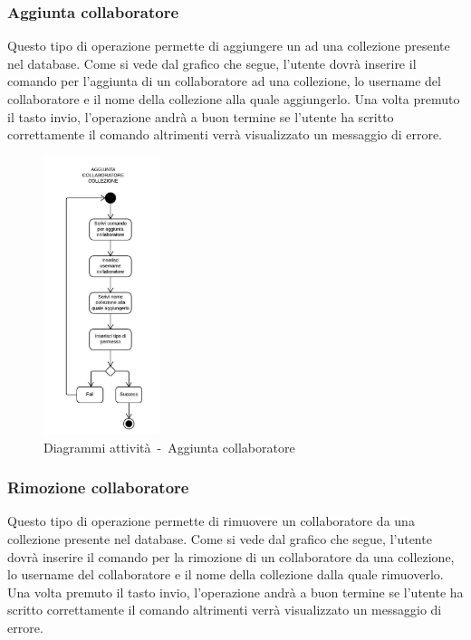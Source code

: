 \documentclass{scalatekids-article}
\begin{document}
\subsubsection{Aggiunta collaboratore}

Questo tipo di operazione permette di aggiungere un  ad
una collezione presente nel database. Come si vede dal grafico che segue,
l'utente dovrà inserire il comando per l'aggiunta di un collaboratore ad una
collezione, lo username del collaboratore e il nome della collezione alla
quale aggiungerlo. Una volta premuto il tasto invio, l'operazione andrà a buon
termine se l'utente ha scritto correttamente il comando altrimenti verrà
visualizzato un messaggio di errore.

\begin{figure}[H]
  \begin{center}
    \includegraphics[width=0.3\textwidth, keepaspectratio]{img/diagrammiAttivita/aggCollaboratore.jpeg}
    \caption{Diagrammi attività\ -\ Aggiunta collaboratore}
  \end{center}
\end{figure}

\subsubsection{Rimozione collaboratore}

Questo tipo di operazione permette di rimuovere un collaboratore da una
collezione presente nel database. Come si vede dal grafico che segue, l'utente
dovrà inserire il comando per la rimozione di un collaboratore da una
collezione, lo username del collaboratore e il nome della collezione dalla
quale rimuoverlo. Una volta premuto il tasto invio, l'operazione andrà a buon
termine se l'utente ha scritto correttamente il comando altrimenti verrà
visualizzato un messaggio di errore.
\end{document}
